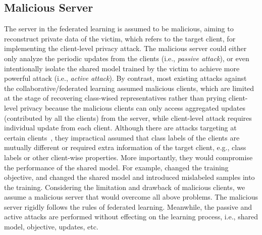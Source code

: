 \documentclass[10pt, conference, letterpaper]{IEEEtran}
\begin{document}
\subsection{Malicious Server}
The server in the federated learning is assumed to be malicious, aiming to reconstruct private data of the victim, which refers to the target client, for implementing the client-level privacy attack.
The malicious server could either only analyze the periodic updates from the clients (i.e., \textit{passive attack}), or even intentionally isolate the shared model trained by the victim to achieve more powerful attack (i.e., \textit{active attack}).
By contrast, most existing attacks against the collaborative/federated learning assumed malicious clients, which are limited at the stage of recovering class-wised representatives rather than prying client-level privacy because the malicious clients can only access aggregated updates (contributed by all the clients) from the server, while client-level attack requires individual update from each client.
Although there are attacks targeting at certain clients~\cite{hitaj2017deep,melis2018inference}, they impractical assumed that class labels of the clients are mutually different or required extra information of the target client, e.g., class labels or other client-wise properties.
More importantly, they would compromise the performance of the shared model. For example, \cite{melis2018inference} changed the training objective, and \cite{hitaj2017deep} changed the shared model and introduced mislabeled samples into the training. Considering the limitation and drawback of malicious clients, we assume a malicious server that would overcome all above problems.
The malicious server rigidly follows the rules of federated learning. Meanwhile, the passive and active attacks are performed without effecting on the learning process, i.e., shared model, objective, updates, etc.

\end{document}
